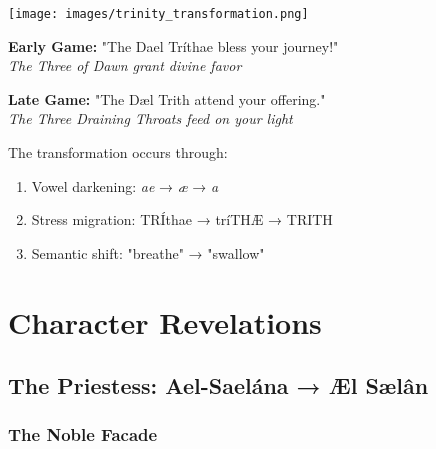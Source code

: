 \documentclass[11pt,a4paper,twoside]{book}
\begin{document}
\begin{center}
\texttt{[image: images/trinity\_transformation.png]}
\end{center}

\begin{tcolorbox}[width=\textwidth, colback=white, colframe=dawn, boxrule=1pt]
\textbf{Early Game:} "The Dael Tríthae bless your journey!"\\
\textit{The Three of Dawn grant divine favor}
\end{tcolorbox}

\begin{tcolorbox}[width=\textwidth, colback=black!10, colframe=blood, boxrule=2pt]
\textbf{Late Game:} "The Dæl Trith attend your offering."\\
\textit{The Three Draining Throats feed on your light}
\end{tcolorbox}

The transformation occurs through:
\begin{enumerate}
    \item Vowel darkening: \textit{ae} → \textit{æ} → \textit{a}
    \item Stress migration: TRÍthae → tríTHÆ → TRITH
    \item Semantic shift: "breathe" → "swallow"
\end{enumerate}

\chapter{Character Revelations}

\section{The Priestess: Ael-Saelána → Æl Sælân}

\begin{adjustwidth}{0em}{0em}
\end{adjustwidth}

\subsection{The Noble Facade}
\end{document}
